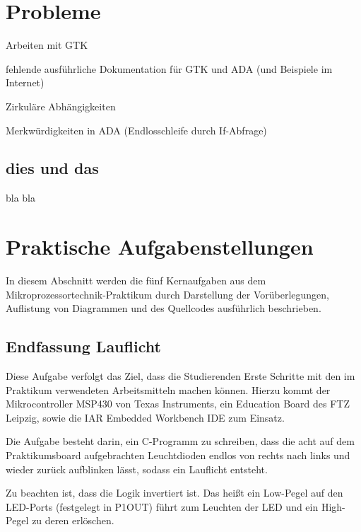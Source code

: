 \documentclass[12pt,a4paper,bibliography=totocnumbered,listof=totocnumbered]{scrartcl}
\begin{document}
\section{Probleme}
Arbeiten mit GTK

fehlende ausführliche Dokumentation für GTK und ADA (und Beispiele im Internet)

Zirkuläre Abhängigkeiten

Merkwürdigkeiten in ADA (Endlosschleife durch If-Abfrage)

\subsection{dies und das}
bla bla

\pagebreak


\section{Praktische Aufgabenstellungen}

In diesem Abschnitt werden die fünf Kernaufgaben aus dem Mikroprozessortechnik-Praktikum durch Darstellung der Vorüberlegungen, Auflistung von Diagrammen und des Quellcodes ausführlich beschrieben.

\subsection{Endfassung Lauflicht}
Diese Aufgabe verfolgt das Ziel, dass die Studierenden Erste Schritte mit den im Praktikum verwendeten Arbeitsmitteln machen können.
Hierzu kommt der Mikrocontroller MSP430 von Texas Instruments, ein Education Board des FTZ Leipzig, sowie die IAR Embedded Workbench IDE zum Einsatz.

Die Aufgabe besteht darin, ein C-Programm zu schreiben, dass die acht auf dem Praktikumsboard aufgebrachten Leuchtdioden endlos von rechts nach links und wieder zurück aufblinken lässt, sodass ein Lauflicht entsteht.

Zu beachten ist, dass die Logik invertiert ist. Das heißt ein Low-Pegel auf den LED-Ports (festgelegt in P1OUT) führt zum Leuchten der LED und ein High-Pegel zu deren erlöschen.
\end{document}
